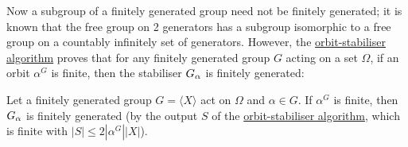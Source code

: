 Now a subgroup of a finitely generated group need not be finitely generated; it is known that the free group on 2 generators has a subgroup isomorphic to a free group on a countably infinitely set of generators. However, the \hyperref[alg:orbit_stabiliser]{orbit-stabiliser algorithm} proves that for any finitely generated group $G$ acting on a set $\Omega$, if an orbit $\alpha^G$ is finite, then the stabiliser $\added{2}{G_\alpha}$ is finitely generated:

\begin{corollary}\label{cor:stabiliser_is_finitely_generated}
    Let a finitely generated group $G = \langle X \rangle$ act on $\Omega$ and $\alpha \in G$. If $\alpha^G$ is finite, then $\added{2}{G_\alpha}$ is finitely generated (by the output $S$ of the \hyperref[alg:orbit_stabiliser]{orbit-stabiliser algorithm}, which is finite with $|S| \leq 2|\alpha^G||X|$). \qedhere
\end{corollary}

